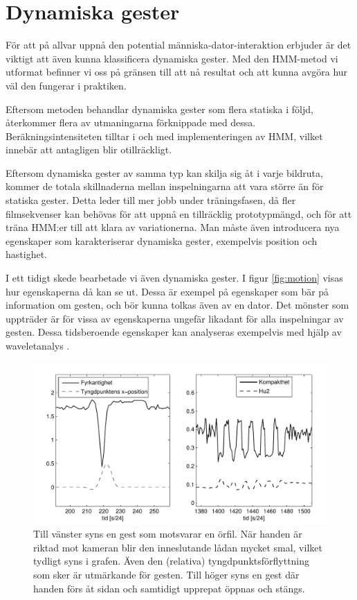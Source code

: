 \documentclass[../rapport_MVEX01-11-05]{subfiles}
\begin{document}
\section{Dynamiska gester}
För att på allvar uppnå den potential människa-dator-interaktion erbjuder
är det viktigt att även kunna klassificera dynamiska gester.
Med den HMM-metod vi utformat befinner vi oss på gränsen till
att nå resultat och att kunna avgöra hur väl den fungerar i praktiken.

Eftersom metoden behandlar dynamiska gester som flera 
statiska i följd, återkommer flera av utmaningarna förknippade med dessa. 
Beräkningsintensiteten tilltar i och med implementeringen av HMM, vilket innebär 
att \MATLAB antagligen blir otillräckligt.

Eftersom dynamiska gester av samma typ kan skilja sig åt i varje bildruta,
kommer de totala skillnaderna mellan inspelningarna att vara större än för statiska
gester.
Detta leder till 
mer jobb under träningsfasen, då fler filmsekvenser kan behövas för att uppnå en 
tillräcklig prototypmängd, och för att träna HMM:er till att klara av variationerna. 
Man måste även introducera nya egenskaper som karakteriserar dynamiska gester, 
exempelvis position och hastighet.

I ett tidigt skede bearbetade vi även dynamiska gester.
I figur \vref{fig:motion} visas hur egenskaperna då kan se ut.
Dessa är exempel på egenskaper som bär på
information om gesten, och bör kunna tolkas även av en dator.
Det mönster som uppträder är för vissa av egenskaperna
ungefär likadant för alla inspelningar av gesten.
Dessa tidsberoende egenskaper kan analyseras exempelvis
med hjälp av waveletanalys \cite{Hastie09}. 

\begin{figure}[tbp]
    \begin{center}
        \includegraphics[width=\columnwidth]{bilder/motion}
    \end{center}
    \caption{Till vänster syns en gest som motsvarar en örfil.
    När handen är riktad mot kameran blir den inneslutande
    lådan mycket smal, vilket tydligt syns i grafen.
    Även den (relativa) tyngdpunktsförflyttning som sker är utmärkande för
    gesten.
     Till höger syns en gest där handen förs åt sidan och samtidigt
    upprepat öppnas och stängs.}
    \label{fig:motion}
\end{figure}
\end{document}
